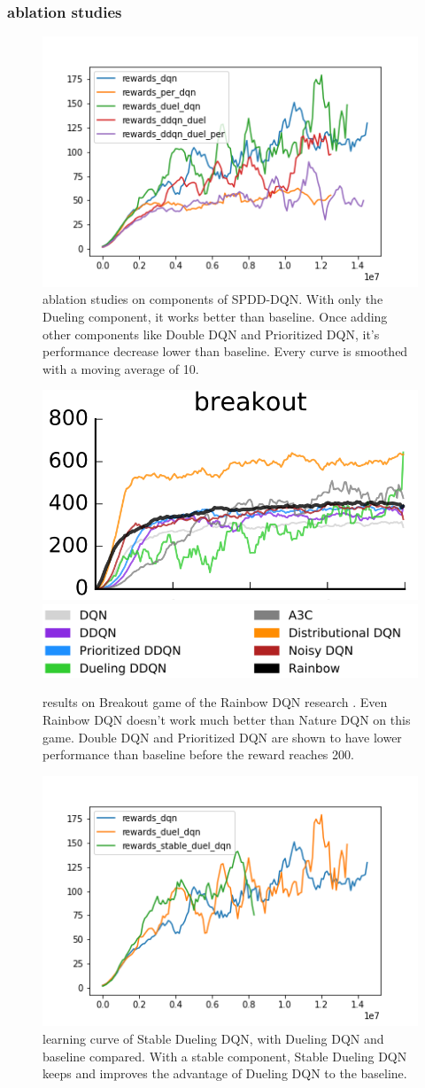 \documentclass[a4paper, 11pt]{article}
\begin{document}
\subsubsection{ablation studies}
\begin{figure}[htbp]
      \centering
      \includegraphics[width = 0.6 \textwidth]{02}
      \caption{ablation studies on components of SPDD-DQN. With only the Dueling component, it works better than baseline. Once adding other components like Double DQN and Prioritized DQN, it's performance decrease lower than baseline. Every curve is smoothed with a moving average of 10.}\label{res2}
\end{figure}
\begin{figure}[htbp]
      \centering
      \includegraphics[width = 0.5 \textwidth]{11}
      \includegraphics[width = 0.5 \textwidth]{12}
      \caption{results on Breakout game  of the Rainbow DQN research \cite{ref7}. Even Rainbow DQN doesn't work much better than Nature DQN on this game. Double DQN and Prioritized DQN are shown to have lower performance than baseline before the reward reaches 200.}\label{res3}
\end{figure}
\begin{figure}[htbp]
      \centering
      \includegraphics[width = 0.6 \textwidth]{03}
      \caption{learning curve of Stable Dueling DQN, with Dueling DQN and baseline compared. With a stable component, Stable Dueling DQN keeps and improves the advantage of Dueling DQN to the baseline.}\label{res4}
\end{figure}
\end{document}
